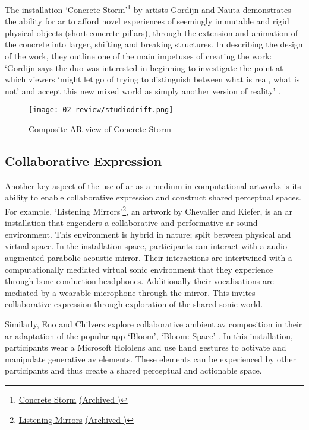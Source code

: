 The installation `Concrete Storm'\footnote{\href{https://studiodrift.com/work/concrete-storm/}{Concrete Storm} \href{https://archive.today/9Yjo1}{(Archived \faArchive)}} by artists Gordijn and Nauta demonstrates the ability for \gls{ar} to afford novel experiences of seemingly immutable and rigid physical objects (short concrete pillars), through the extension and animation of the concrete into larger, shifting and breaking structures. In describing the design of the work, they outline one of the main impetuses of creating the work: `Gordijn says the duo was interested in beginning to investigate the point at which viewers `might let go of trying to distinguish between what is real, what is not' and accept this new mixed world as simply another version of reality' \citep{gottschalk2017}. 

\begin{figure}[ht]
    \centering
    \texttt{[image: 02-review/studiodrift.png]}
    \captionsetup{justification=centering,margin=1.5cm}
    \caption{Composite AR view of Concrete Storm \citep[from][]{gordijn2017}}
\end{figure}\label{fig: concretestorm}

\subsection{Collaborative Expression}\label{sec: ar-arts-collaboration}
Another key aspect of the use of \gls{ar} as a medium in computational artworks is its ability to enable collaborative expression and construct shared perceptual spaces. For example, `Listening Mirrors'\footnote{\href{https://users.sussex.ac.uk/~cc293/listeningmirrors/}{Listening Mirrors} \href{https://archive.today/W9Ecl}{(Archived \faArchive)}}, an artwork by Chevalier and Kiefer, \citeyearpar{chevalier2018} is an \gls{ar} installation that engenders a collaborative and performative \gls{ar} sound environment. This environment is hybrid in nature; split between physical and virtual space. In the installation space, participants can interact with a audio augmented parabolic acoustic mirror. Their interactions are intertwined with a computationally mediated virtual sonic environment that they experience through bone conduction headphones. Additionally their vocalisations are mediated by a wearable microphone through the mirror. This invites collaborative expression through exploration of the shared sonic world.

Similarly, Eno and Chilvers explore collaborative ambient \gls{av} composition in their \gls{ar} adaptation of the popular app `Bloom', `Bloom: Space' \citep{eno2018}. In this installation, participants wear a Microsoft Hololens and use hand gestures to activate and manipulate generative \gls{av} elements. These elements can be experienced by other participants and thus create a shared perceptual and actionable space.

